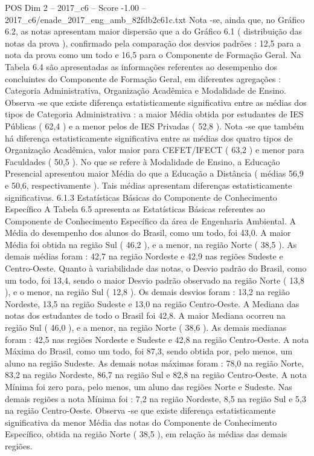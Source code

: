 \begin{textsample}{POS Dim 2 – 2017\_c6 – Score -1.00 – 2017\_c6/enade\_2017\_eng\_amb\_82fdb2c61c.txt}
Nota -se, ainda que, no Gráfico 6.2, as notas apresentam maior dispersão que a do Gráfico 6.1 ( distribuição das notas da prova ), confirmado pela comparação dos desvios padrões : 12,5 para a nota da prova como um todo e 16,5 para o Componente de Formação Geral.
Na Tabela 6.4 são apresentadas as informações referentes ao desempenho dos concluintes do Componente de Formação Geral, em diferentes agregações : Categoria Administrativa, Organização Acadêmica e Modalidade de Ensino.
Observa -se que existe diferença estatisticamente significativa entre as médias dos tipos de Categoria Administrativa : a maior Média obtida por estudantes de IES Públicas ( 62,4 ) e a menor pelos de IES Privadas ( 52,8 ).
Nota -se que também há diferença estatisticamente significativa entre as médias dos quatro tipos de Organização Acadêmica, valor maior para CEFET/IFECT ( 63,2 ) e menor para Faculdades ( 50,5 ).
No que se refere à Modalidade de Ensino, a Educação Presencial apresentou maior Média do que a Educação a Distância ( médias 56,9 e 50,6, respectivamente ).
Tais médias apresentam diferenças estatisticamente significativas. 6.1.3 Estatísticas Básicas do Componente de Conhecimento Específico A Tabela 6.5 apresenta as Estatísticas Básicas referentes ao Componente de Conhecimento Específico da área de Engenharia Ambiental.
A Média do desempenho dos alunos do Brasil, como um todo, foi 43,0.
A maior Média foi obtida na região Sul ( 46,2 ), e a menor, na região Norte ( 38,5 ).
As demais médias foram : 42,7 na região Nordeste e 42,9 nas regiões Sudeste e Centro-Oeste.
Quanto à variabilidade das notas, o Desvio padrão do Brasil, como um todo, foi 13,4, sendo o maior Desvio padrão observado na região Norte ( 13,8 ), e o menor, na região Sul ( 12,8 ).
Os demais desvios foram : 13,2 na região Nordeste, 13,5 na região Sudeste e 13,0 na região Centro-Oeste.
A Mediana das notas dos estudantes de todo o Brasil foi 42,8.
A maior Mediana ocorreu na região Sul ( 46,0 ), e a menor, na região Norte ( 38,6 ).
As demais medianas foram : 42,5 nas regiões Nordeste e Sudeste e 42,8 na região Centro-Oeste.
A nota Máxima do Brasil, como um todo, foi 87,3, sendo obtida por, pelo menos, um aluno na região Sudeste.
As demais notas máximas foram : 78,0 na região Norte, 83,2 na região Nordeste, 86,7 na região Sul e 82,8 na região Centro-Oeste.
A nota Mínima foi zero para, pelo menos, um aluno das regiões Norte e Sudeste.
Nas demais regiões a nota Mínima foi : 7,2 na região Nordeste, 8,5 na região Sul e 5,3 na região Centro-Oeste.
Observa -se que existe diferença estatisticamente significativa da menor Média das notas do Componente de Conhecimento Específico, obtida na região Norte ( 38,5 ), em relação às médias das demais regiões.

\end{textsample}
